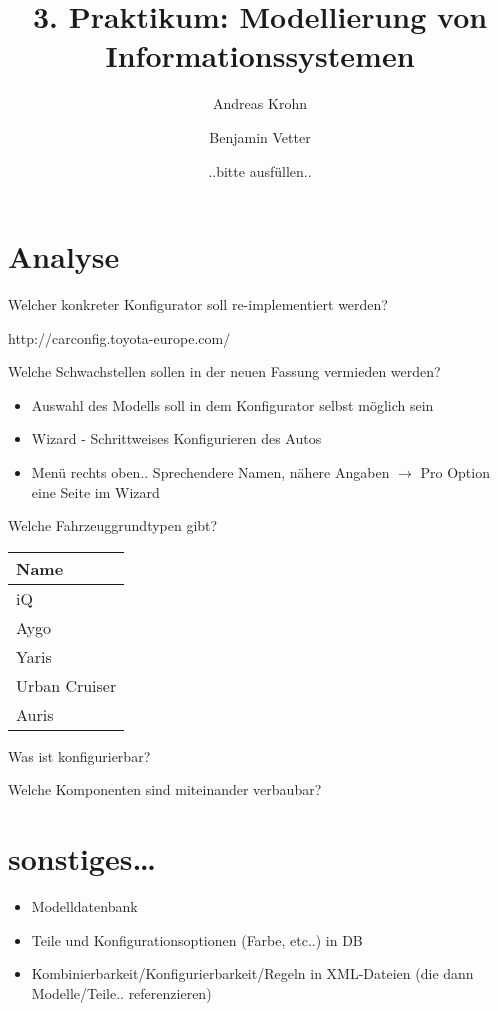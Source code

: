 \documentclass[a4paper,10pt]{article}
\title{3. Praktikum: Modellierung von Informationssystemen}
\author{Andreas Krohn \and Benjamin Vetter \and ..bitte ausfüllen..}
\begin{document}
\maketitle

\tableofcontents

\section{Analyse}
Welcher konkreter Konfigurator soll re-implementiert werden?

http://carconfig.toyota-europe.com/

Welche Schwachstellen sollen in der neuen Fassung vermieden werden?

\begin{itemize}
 \item Auswahl des Modells soll in dem Konfigurator selbst möglich sein
 \item Wizard - Schrittweises Konfigurieren des Autos
 \item Menü rechts oben.. Sprechendere Namen, nähere Angaben $\rightarrow$ Pro Option eine Seite im Wizard
\end{itemize}
Welche Fahrzeuggrundtypen gibt? 

\begin{tabular}{|l|}
\hline
Name \\
\hline
iQ \\
Aygo \\
Yaris \\
Urban Cruiser \\
Auris\\
\hline
\end{tabular}

Was ist konfigurierbar?

Welche Komponenten sind miteinander verbaubar?



\section{sonstiges\ldots}
\begin{itemize}
 \item Modelldatenbank
 \item Teile und Konfigurationsoptionen (Farbe, etc..) in DB
 \item Kombinierbarkeit/Konfigurierbarkeit/Regeln in XML-Dateien (die dann Modelle/Teile.. referenzieren)
\end{itemize}
\end{document}
